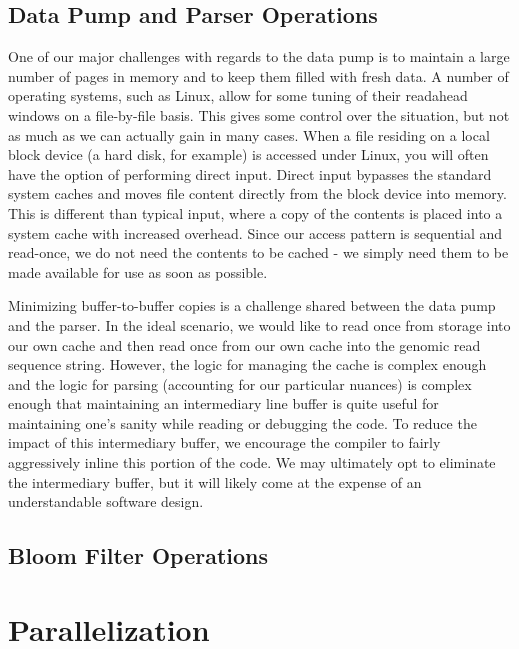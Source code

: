 \documentclass{article}
\begin{document}
\subsection{Data Pump and Parser Operations}

One of our major challenges with regards to the data pump is to maintain a large number of pages in memory and to keep them filled with fresh data. A number of operating systems, such as Linux, allow for some tuning of their readahead windows on a file-by-file basis. This gives some control over the situation, but not as much as we can actually gain in many cases. When a file residing on a local block device (a hard disk, for example) is accessed under Linux, you will often have the option of performing direct input. Direct input bypasses the standard system caches and moves file content directly from the block device into memory. This is different than typical input, where a copy of the contents is placed into a system cache with increased overhead. Since our access pattern is sequential and read-once, we do not need the contents to be cached - we simply need them to be made available for use as soon as possible.

Minimizing buffer-to-buffer copies is a challenge shared between the data pump and the parser. In the ideal scenario, we would like to read once from storage into our own cache and then read once from our own cache into the genomic read sequence string. However, the logic for managing the cache is complex enough and the logic for parsing (accounting for our particular nuances) is complex enough that maintaining an intermediary line buffer is quite useful for maintaining one's sanity while reading or debugging the code. To reduce the impact of this intermediary buffer, we encourage the compiler to fairly aggressively inline this portion of the code. We may ultimately opt to eliminate the intermediary buffer, but it will likely come at the expense of an understandable software design.

\subsection{Bloom Filter Operations}



\section{Parallelization}
\end{document}
